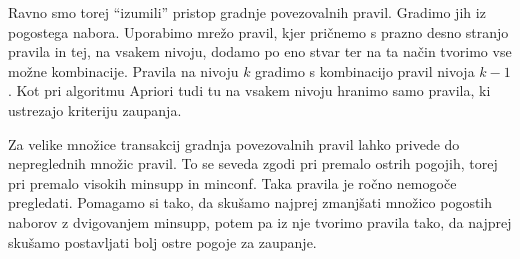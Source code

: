 Ravno smo torej ``izumili'' pristop gradnje povezovalnih pravil. Gradimo jih iz pogostega nabora. Uporabimo mrežo pravil, kjer pričnemo s prazno desno stranjo pravila in tej, na vsakem nivoju, dodamo po eno stvar ter na ta način tvorimo vse možne kombinacije. Pravila na nivoju $k$ gradimo s kombinacijo pravil nivoja $k-1$. Kot pri algoritmu Apriori tudi tu na vsakem nivoju hranimo samo pravila, ki ustrezajo kriteriju zaupanja.

Za velike množice transakcij gradnja povezovalnih pravil lahko privede do nepreglednih množic pravil. To se seveda zgodi pri premalo ostrih pogojih, torej pri premalo visokih minsupp in minconf. Taka pravila je ročno nemogoče pregledati. Pomagamo si tako, da skušamo najprej zmanjšati množico pogostih naborov z dvigovanjem minsupp, potem pa iz nje tvorimo pravila tako, da najprej skušamo postavljati bolj ostre pogoje za zaupanje. 
